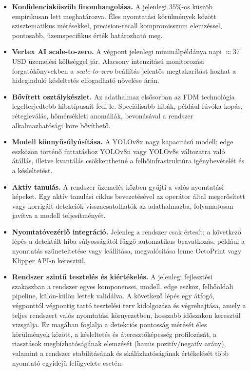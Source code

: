 \begin{itemize}
    \item \textbf{Konfidenciaküszöb finomhangolása.} A jelenlegi 35\%-os küszöb empirikusan lett
    meghatározva. Éles nyomtatási körülmények között szisztematikus mérésekkel, precision-recall
    kompromisszum elemzéssel, pontosabb, üzemspecifikus érték határozható meg.

    \item \textbf{Vertex AI scale-to-zero.} A végpont jelenlegi minimálpéldánya napi $\approx$37 USD
    üzemelési költséggel jár. Alacsony intenzitású monitorozási forgatókönyvekben a \textit{scale-to-zero}
    beállítás jelentős megtakarítást hozhat a hideginduló késleltetés elfogadható növelése árán.

    \item \textbf{Bővített osztálykészlet.} Az adathalmaz elsősorban az FDM technológia legelterjedtebb
    hibatípusait fedi le. Speciálisabb hibák, például fúvóka-kopás, rétegleválás, hőmérsékleti
    anomáliák, bevonásával a rendszer alkalmazhatósági köre bővíthető.

    \item \textbf{Modell könnyűsúlyúsítása.} A YOLOv8x nagy kapacitású modell; edge eszközön történő
    futtatáshoz YOLOv8n vagy YOLOv8s változatra való átállás, illetve kvantálás csökkenthetné
    a felhőinfrastruktúra igénybevételét és a késleltetést.

    \item \textbf{Aktív tanulás.} A rendszer üzemelés közben gyűjti a valós nyomtatási képeket.
    Egy aktív tanulási ciklus bevezetésével az operátor által megerősített vagy korrigált detekciók
    visszacsatolhatók az adathalmazba, folyamatosan javítva a modell teljesítményét.

    \item \textbf{Nyomtatóvezérlő integráció.} Jelenleg a rendszer csak értesít; a következő lépés
    a detektált hiba súlyosságától függő automatikus beavatkozás, például a nyomtatás szüneteltetése
    vagy leállítása, megvalósítása lenne OctoPrint vagy Klipper API-n keresztül.

    \item \textbf{Rendszer szintű tesztelés és kiértékelés.} A jelenlegi fejlesztési szakaszban a
    rendszer egyes komponensei, modell, edge eszköz, felhőoldali pipeline, külön-külön lettek
    validálva. A következő lépés egy átfogó, végponttól végpontig tartó tesztelési terv kidolgozása
    és végrehajtása, amely a teljes rendszert valós nyomtatási környezetben, hosszabb időszakon
    keresztül vizsgálja. Ez magában foglalja a detekciós pontosság mérését éles körülmények között,
    a késleltetés és áteresztőképesség profilozását, a riasztások megbízhatóságának elemzését
    (hamis pozitív/negatív arány), valamint a rendszer stabilitásának és skálázhatóságának értékelését
    több nyomtató egyidejű felügyelete esetén.
\end{itemize}
